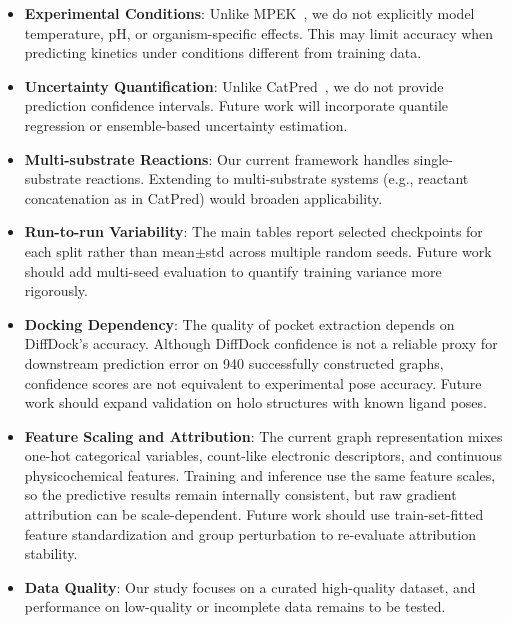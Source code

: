\documentclass[11pt]{article}
\begin{document}
\begin{itemize}
    \item \textbf{Experimental Conditions}: Unlike MPEK~\citep{mpek2024}, we do not explicitly model temperature, pH, or organism-specific effects. This may limit accuracy when predicting kinetics under conditions different from training data.

    \item \textbf{Uncertainty Quantification}: Unlike CatPred~\citep{catpred}, we do not provide prediction confidence intervals. Future work will incorporate quantile regression or ensemble-based uncertainty estimation.

    \item \textbf{Multi-substrate Reactions}: Our current framework handles single-substrate reactions. Extending to multi-substrate systems (e.g., reactant concatenation as in CatPred) would broaden applicability.

    \item \textbf{Run-to-run Variability}: The main tables report selected checkpoints for each split rather than mean$\pm$std across multiple random seeds. Future work should add multi-seed evaluation to quantify training variance more rigorously.

    \item \textbf{Docking Dependency}: The quality of pocket extraction depends on DiffDock's accuracy. Although DiffDock confidence is not a reliable proxy for downstream prediction error on 940 successfully constructed graphs, confidence scores are not equivalent to experimental pose accuracy. Future work should expand validation on holo structures with known ligand poses.

    \item \textbf{Feature Scaling and Attribution}: The current graph representation mixes one-hot categorical variables, count-like electronic descriptors, and continuous physicochemical features. Training and inference use the same feature scales, so the predictive results remain internally consistent, but raw gradient attribution can be scale-dependent. Future work should use train-set-fitted feature standardization and group perturbation to re-evaluate attribution stability.

    \item \textbf{Data Quality}: Our study focuses on a curated high-quality dataset, and performance on low-quality or incomplete data remains to be tested.
\end{itemize}
\end{document}
